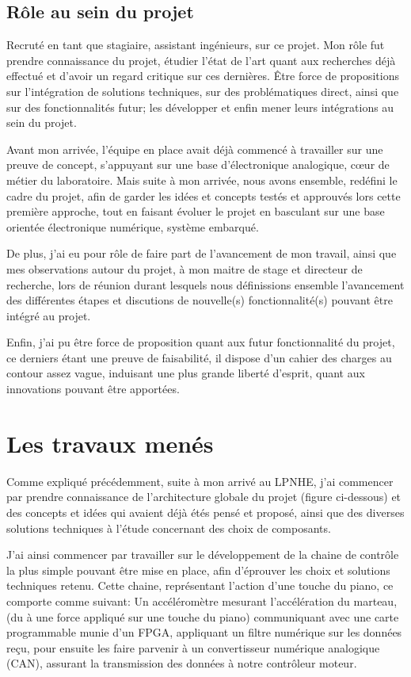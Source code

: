 \documentclass[french,a4paper,12pt]{report}
\begin{document}
	\section{Rôle au sein du projet}	
	
	Recruté en tant que stagiaire, assistant ingénieurs, sur ce projet. Mon rôle fut prendre connaissance du projet, étudier l'état de l'art quant aux recherches déjà effectué et d'avoir un regard critique sur ces dernières. Être force de propositions sur l'intégration de solutions techniques, sur des problématiques direct, ainsi que sur des fonctionnalités futur; les développer et enfin mener leurs intégrations au sein du projet.
	
	Avant mon arrivée, l'équipe en place avait déjà commencé à travailler sur une preuve de concept, s'appuyant sur une base d'électronique analogique, cœur de métier du laboratoire. Mais suite à mon arrivée, nous avons ensemble, redéfini le cadre du projet, afin de garder les idées et concepts testés et approuvés lors cette première approche, tout en faisant évoluer le projet en basculant sur une base orientée électronique numérique, système embarqué.
	
	De plus, j'ai eu pour rôle de faire part de l'avancement de mon travail, ainsi que mes observations autour du projet, à mon maitre de stage et directeur de recherche, lors de réunion durant lesquels nous définissions ensemble l'avancement des différentes étapes et discutions de nouvelle(s) fonctionnalité(s) pouvant être intégré au projet.
	
	Enfin, j'ai pu être force de proposition quant aux futur fonctionnalité du projet, ce derniers étant une preuve de faisabilité, il dispose d'un cahier des charges au contour assez vague, induisant une plus grande liberté d'esprit, quant aux innovations pouvant être apportées.	
	
	
	\chapter{Les travaux menés}
	
	Comme expliqué précédemment, suite à mon arrivé au LPNHE, j'ai commencer par prendre connaissance de l'architecture globale du projet (figure ci-dessous) et des concepts et idées qui avaient déjà étés pensé et proposé, ainsi que des diverses solutions techniques à l'étude concernant des choix de composants.
	
	J'ai ainsi commencer par travailler sur le développement de la chaine de contrôle la plus simple pouvant être mise en place, afin d'éprouver les choix et solutions techniques retenu.
	Cette chaine, représentant l'action d'une touche du piano, ce comporte comme suivant: Un accéléromètre mesurant l'accélération du marteau, (du à une force appliqué sur une touche du piano) communiquant avec une carte programmable munie d'un FPGA, appliquant un filtre numérique sur les données reçu, pour ensuite les faire parvenir à un convertisseur numérique analogique (CAN), assurant la transmission des données à notre contrôleur moteur.\newline
	
\end{document}
